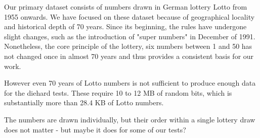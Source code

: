 Our primary dataset consists of numbers drawn in German lottery Lotto from 1955 onwards. We have focused on these dataset because of geographical locality
and historical depth of 70 years. Since its beginning, the rules have undergone slight changes, such as the introduction of "super numbers" in December
of 1991. Nonetheless, the core principle of the lottery, six numbers between 1 and 50 has not changed once in almost 70 years and thus provides a consistent
basis for our work.


However even 70 years of Lotto numbers is not sufficient to produce enough data for the diehard tests. These require 10 to 12 MB of random bits, which is
substantially more than 28.4 KB of Lotto numbers.


The numbers are drawn individually, but their order within a single lottery draw does not matter - but maybe it does for some of our tests?

